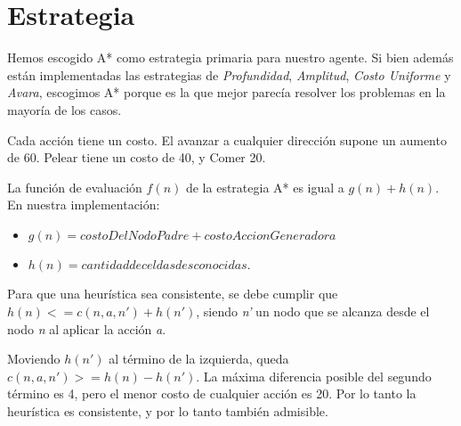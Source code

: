 \section{Estrategia}

Hemos escogido A* como estrategia primaria para nuestro agente.  Si bien además
están implementadas las estrategias de \emph{Profundidad}, \emph{Amplitud},
\emph{Costo Uniforme} y \emph{Avara}, escogimos A* porque es la que mejor
parecía resolver los problemas en la mayoría de los casos.

Cada acción tiene un costo. El avanzar a cualquier dirección supone un aumento
de 60. Pelear tiene un costo de 40, y Comer 20.

La función de evaluación $f(n)$ de la estrategia A* es igual a $g(n) + h(n)$.
En nuestra implementación:

\begin{itemize}
\item $g(n) = costoDelNodoPadre + costoAccionGeneradora$
\item $h(n) = cantidad de celdas desconocidas$.
\end{itemize}

Para que una heurística sea consistente, se debe cumplir que $h(n) <= c(n,a,n')
+ h(n')$, siendo \emph{n'} un nodo que se alcanza desde el nodo \emph{n} al
aplicar la acción \emph{a}.

Moviendo $h(n')$ al término de la izquierda, queda $c(n,a,n') >= h(n) - h(n')$.
La máxima diferencia posible del segundo término es 4, pero el menor costo de
cualquier acción es 20. Por lo tanto la heurística es consistente, y por lo
tanto también admisible.

